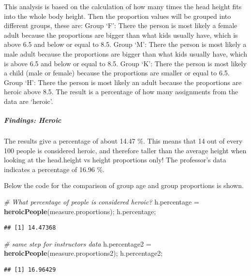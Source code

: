 \documentclass[]{article}
\newenvironment{Shaded}{\begin{snugshade}}{\end{snugshade}}
\newcommand{\CommentTok}[1]{\textcolor[rgb]{0.56,0.35,0.01}{\textit{#1}}}
\newcommand{\KeywordTok}[1]{\textcolor[rgb]{0.13,0.29,0.53}{\textbf{#1}}}
\newcommand{\NormalTok}[1]{#1}
\newcommand{\StringTok}[1]{\textcolor[rgb]{0.31,0.60,0.02}{#1}}
\begin{document}
This analysis is based on the calculation of how many times the head
height fits into the whole body height. Then the proportion values will
be grouped into different groups, these are: Group `F': There the person
is most likely a female adult because the proportions are bigger than
what kids usually have, which is above 6.5 and below or equal to 8.5.
Group `M': There the person is most likely a male adult because the
proportions are bigger than what kids usually have, which is above 6.5
and below or equal to 8.5. Group `K': There the person is most likely a
child (male or female) because the proportions are smaller or equal to
6.5. Group `H': There the person is most likely an adult because the
proportions are heroic above 8.5. The result is a percentage of how many
assignments from the data are `heroic'.

\subparagraph{Findings: Heroic}
\label{sec:appendix-findings-heroic}

The results give a percentage of about 14.47 \%. This means that 14 out
of every 100 people is considered heroic, and therefore taller than the
average height when looking at the head.height vs height proportions
only! The professor's data indicates a percentage of 16.96 \%.

Below the code for the comparison of group age and group proportions is
shown.

\begin{Shaded}
\begin{Highlighting}[]
\CommentTok{\# What percentage of people is considered heroic?}
\NormalTok{h.percentage =}\StringTok{ }\KeywordTok{heroicPeople}\NormalTok{(measure.proportions);}
\NormalTok{h.percentage;}
\end{Highlighting}
\end{Shaded}

\begin{verbatim}
## [1] 14.47368
\end{verbatim}

\begin{Shaded}
\begin{Highlighting}[]
\CommentTok{\# same step for instructors data}
\NormalTok{h.percentage2 =}\StringTok{ }\KeywordTok{heroicPeople}\NormalTok{(measure.proportions2);}
\NormalTok{h.percentage2;}
\end{Highlighting}
\end{Shaded}

\begin{verbatim}
## [1] 16.96429
\end{verbatim}
\end{document}
